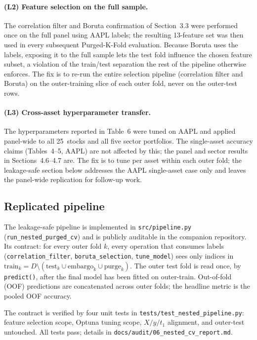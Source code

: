 \documentclass{rQUF2e}
\begin{document}
\paragraph{(L2) Feature selection on the full sample.} The
correlation filter and Boruta confirmation of Section~3.3 were
performed once on the full panel using AAPL labels; the resulting
13-feature set was then used in every subsequent Purged-K-Fold
evaluation. Because Boruta uses the labels, exposing it to the full
sample lets the test fold influence the chosen feature subset, a
violation of the train/test separation the rest of the pipeline
otherwise enforces. The fix is to re-run the entire selection
pipeline (correlation filter and Boruta) on the outer-training
slice of each outer fold, never on the outer-test rows.

\paragraph{(L3) Cross-asset hyperparameter transfer.} The
hyperparameters reported in Table~6 were tuned on AAPL and applied
panel-wide to all 25~stocks and all five sector portfolios. The
single-asset accuracy claims (Tables~4--5, AAPL) are not affected
by this; the panel and sector results in Sections~4.6--4.7 are.
The fix is to tune per asset within each outer fold; the leakage-safe section
below addresses the AAPL single-asset case only and leaves the
panel-wide replication for follow-up work.

\subsection{Replicated pipeline}

The leakage-safe pipeline is implemented in
\texttt{src/pipeline.py} (\texttt{run\_nested\_purged\_cv}) and is
publicly auditable in the companion repository. Its contract:
for every outer fold $k$, every operation that consumes labels
(\texttt{correlation\_filter}, \texttt{boruta\_selection},
\texttt{tune\_model}) sees only indices in $\text{train}_k = D
\setminus (\text{test}_k \cup \text{embargo}_k \cup \text{purge}_k)$.
The outer test fold is read once, by \texttt{predict()}, after the
final model has been fitted on outer-train. Out-of-fold (OOF)
predictions are concatenated across outer folds; the headline
metric is the pooled OOF accuracy.

The contract is verified by four unit tests in
\texttt{tests/test\_nested\_pipeline.py}: feature selection scope,
Optuna tuning scope, $X/y/t_1$ alignment, and outer-test
untouched. All tests pass; details in
\texttt{docs/audit/06\_nested\_cv\_report.md}.
\end{document}
